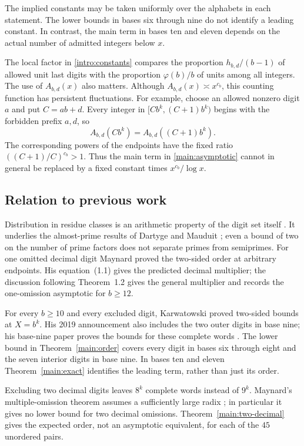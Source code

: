 \documentclass[11pt,a4paper]{article}
\theoremstyle{paperplain}
\numberwithin{equation}{section}
\begin{document}
The implied constants may be taken uniformly over the alphabets in
each statement. The lower bounds in bases six through nine do not
identify a leading constant. In contrast, the main term in bases ten
and eleven depends on the actual number of admitted integers below $x$.

The local factor in \eqref{intro:constants} compares the proportion
$h_{b,d}/(b-1)$ of allowed unit last digits with the proportion
$\varphi(b)/b$ of units among all integers. The use of $A_{b,d}(x)$
also matters. Although $A_{b,d}(x)\asymp x^{c_b}$, this counting
function has persistent fluctuations. For example, choose an allowed
nonzero digit $a$ and put $C=ab+d$. Every integer in
$[Cb^k,(C+1)b^k)$ begins with the forbidden prefix $a,d$, so
\[
 A_{b,d}(Cb^k)=A_{b,d}((C+1)b^k).
\]
The corresponding powers of the endpoints have the fixed ratio
$((C+1)/C)^{c_b}>1$. Thus the main term in
\eqref{main:asymptotic} cannot in general be replaced by a fixed
constant times $x^{c_b}/\log x$.

\subsection{Relation to previous work}

Distribution in residue classes is an arithmetic property of the digit
set itself \cite{ErdosMauduitSarkozy1998}. It underlies the almost-prime
results of Dartyge and Mauduit \cite{DartygeMauduit2000,DartygeMauduit2001};
even a bound of two on the number of prime factors does not separate
primes from semiprimes. For one omitted decimal digit Maynard
\cite[Theorem~1.1]{Maynard2019} proved the two-sided order at arbitrary
endpoints. His equation~(1.1) gives the predicted decimal multiplier;
the discussion following Theorem~1.2 gives the general multiplier and
records the one-omission asymptotic for $b\ge12$.

For every $b\ge10$ and every excluded digit, Karwatowski
\cite[Theorem~1]{Karwatowski2022} proved two-sided bounds at $X=b^k$.
His 2019 announcement \cite{KarwatowskiDMV2019} also includes the two
outer digits in base nine; his base-nine paper proves the bounds for
these complete words \cite[Theorem~1]{KarwatowskiBaseNine}.
The lower bound in Theorem~\ref{main:order} covers every digit in bases
six through eight and the seven interior digits in base nine. In bases
ten and eleven Theorem~\ref{main:exact} identifies the leading term,
rather than just its order.

Excluding two decimal digits leaves $8^k$ complete words instead of
$9^k$. Maynard's multiple-omission theorem assumes a sufficiently large
radix \cite[Theorem~1.2]{Maynard2019}; in particular it gives no lower
bound for two decimal omissions. Theorem~\ref{main:two-decimal} gives
the expected order, not an asymptotic equivalent, for each of the
$45$ unordered pairs.
\end{document}

